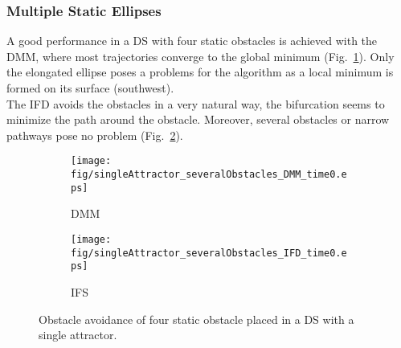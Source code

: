 \subsubsection{Multiple Static Ellipses}
A good performance in a DS with four static obstacles is achieved with the DMM, where most trajectories converge to the global minimum (Fig.~\ref{fig:singleAttractor_severalObstacles_DMM_time0}). Only the elongated ellipse poses a problems for the algorithm as a local minimum is formed on its surface (southwest).\\
The IFD avoids the obstacles in a very natural way, the bifurcation seems to minimize the path around the obstacle. Moreover, several obstacles or narrow pathways pose no problem (Fig.~\ref{fig:singleAttractor_severalObstacles_IFD_time0}).

\begin{figure}[tb]\centering
\begin{subfigure}{.48\columnwidth} %
\centering
\texttt{[image: fig/singleAttractor\_severalObstacles\_DMM\_time0.eps]}
\caption{DMM}
\label{fig:singleAttractor_severalObstacles_DMM_time0}
\end{subfigure}%
\begin{subfigure}{.48\columnwidth} %
\centering
\texttt{[image: fig/singleAttractor\_severalObstacles\_IFD\_time0.eps]}
\caption{IFS}
\label{fig:singleAttractor_severalObstacles_IFD_time0}
\end{subfigure}
\caption{Obstacle avoidance of four static obstacle placed in a DS with a single attractor.}
\label{fig:singleAttractor_severalObstacles_time}
\end{figure}

